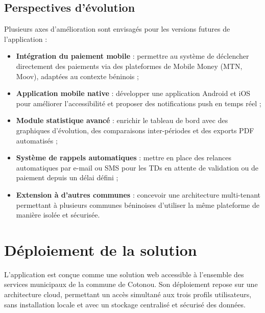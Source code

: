 \subsection{Perspectives d'évolution}

Plusieurs axes d'amélioration sont envisagés pour les versions futures
de l'application :

\begin{itemize}
    \item \textbf{Intégration du paiement mobile} : permettre au
    système de déclencher directement des paiements via des
    plateformes de Mobile Money (MTN, Moov), adaptées au contexte
    béninois ;

    \item \textbf{Application mobile native} : développer une
    application Android et iOS pour améliorer l'accessibilité
    et proposer des notifications push en temps réel ;

    \item \textbf{Module statistique avancé} : enrichir le tableau
    de bord avec des graphiques d'évolution, des comparaisons
    inter-périodes et des exports PDF automatisés ;

    \item \textbf{Système de rappels automatiques} : mettre en place
    des relances automatiques par e-mail ou SMS pour les TDs en
    attente de validation ou de paiement depuis un délai défini ;

    \item \textbf{Extension à d'autres communes} : concevoir une
    architecture multi-tenant permettant à plusieurs communes
    béninoises d'utiliser la même plateforme de manière isolée
    et sécurisée.
\end{itemize}

\section{Déploiement de la solution}

L'application est conçue comme une solution web accessible à l'ensemble
des services municipaux de la commune de Cotonou. Son déploiement repose
sur une architecture cloud, permettant un accès simultané aux trois
profils utilisateurs, sans installation locale et avec un stockage
centralisé et sécurisé des données.

